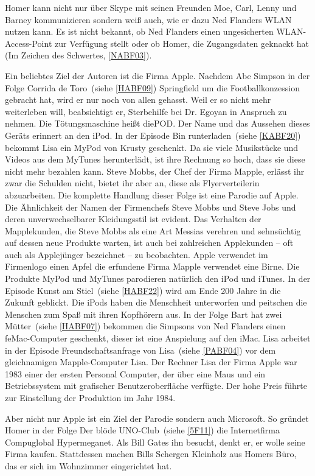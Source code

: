 \begin{appendix}
Homer kann nicht nur über Skype mit seinen Freunden Moe, Carl, Lenny und Barney kommunizieren sondern weiß auch, wie er dazu Ned Flanders WLAN nutzen kann. Es ist nicht bekannt, ob Ned Flanders einen ungesicherten WLAN-Access-Point zur Verfügung stellt oder ob Homer, die Zugangsdaten geknackt hat (\glqq Im Zeichen des Schwertes\grqq , \ref{NABF03}).

Ein beliebtes Ziel der Autoren ist die Firma Apple. Nachdem Abe Simpson in der Folge \glqq Corrida de Toro\grqq\ (siehe \ref{HABF09}) Springfield um die Footballkonzession gebracht hat, wird er nur noch von allen gehasst. Weil er so nicht mehr weiterleben will, beabsichtigt er, Sterbehilfe bei Dr. Egoyan in Anspruch zu nehmen. Die Tötungsmaschine heißt diePOD. Der Name und das Aussehen dieses Geräts erinnert an den iPod. In der Episode \glqq Bin runterladen\grqq\ (siehe \ref{KABF20}) bekommt Lisa ein MyPod von Krusty geschenkt. Da sie viele Musikstücke und Videos aus dem MyTunes herunterlädt, ist ihre Rechnung so hoch, dass sie diese nicht mehr bezahlen kann. Steve Mobbs, der Chef der Firma Mapple, erlässt ihr zwar die Schulden nicht, bietet ihr aber an, diese als Flyerverteilerin abzuarbeiten. Die komplette Handlung dieser Folge ist eine Parodie auf Apple. Die Ähnlichkeit der Namen der Firmenchefs Steve Mobbs und Steve Jobs und deren unverwechselbarer Kleidungsstil ist evident. Das Verhalten der Mapplekunden, die Steve Mobbs als eine Art Messias verehren und sehnsüchtig auf dessen neue Produkte warten, ist auch bei zahlreichen Applekunden -- oft auch als Applejünger bezeichnet -- zu beobachten. Apple verwendet im Firmenlogo einen Apfel die erfundene Firma Mapple verwendet eine Birne. Die Produkte MyPod und MyTunes parodieren natürlich den iPod und iTunes. In der Episode \glqq Kunst am Stiel\grqq\ (siehe \ref{HABF22}) wird am Ende 200 Jahre in die Zukunft geblickt. Die iPods haben die Menschheit unterworfen und peitschen die Menschen zum Spaß mit ihren Kopfhörern aus. In der Folge \glqq Bart hat zwei Mütter\grqq\ (siehe \ref{HABF07}) bekommen die Simpsons von Ned Flanders einen feMac-Computer geschenkt, dieser ist eine Anspielung auf den iMac. Lisa arbeitet in der Episode \glqq Freundschaftsanfrage von Lisa\grqq\ (siehe \ref{PABF04}) vor dem gleichnamigen Mapple-Computer Lisa. Der Rechner Lisa der Firma Apple war 1983 einer der ersten Personal Computer, der über eine Maus und ein Betriebssystem mit grafischer Benutzeroberfläche verfügte. Der hohe Preis führte zur Einstellung der Produktion im Jahr 1984.

Aber nicht nur Apple ist ein Ziel der Parodie sondern auch Microsoft. So gründet Homer in der Folge \glqq Der blöde UNO-Club\grqq\ (siehe \ref{5F11}) die Internetfirma Compuglobal Hypermeganet. Als Bill Gates ihn besucht, denkt er, er wolle seine Firma kaufen. Stattdessen machen Bills Schergen Kleinholz aus Homers Büro, das er sich im Wohnzimmer eingerichtet hat.


\end{appendix}

